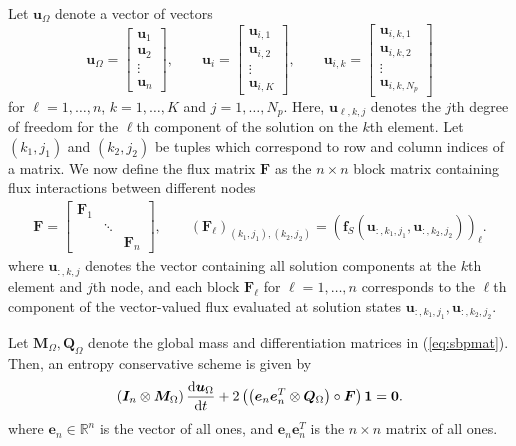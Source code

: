 \documentclass{article}
\newcommand{\td}[2]{\frac{{\rm d}#1}{{\rm d}{ {#2}}}}
\newcommand{\LRp}[1]{\left( #1 \right)}
\newcommand{\eq}[1]{\begin{align*}#1\end{align*}}
\newcommand{\eqlab}[1]{\begin{align}#1\end{align}}
\newcommand{\bmat}[1]{\begin{bmatrix}#1\end{bmatrix}}
\begin{document}
Let $\bm{u}_{\Omega}$ denote a vector of vectors 
\[
\bm{u}_{\Omega} = \bmat{\bm{u}_1\\
\bm{u}_2\\
\vdots\\
\bm{u}_n}, \qquad \bm{u}_i = \bmat{
\bm{u}_{i,1}\\
\bm{u}_{i,2}\\
\vdots\\
\bm{u}_{i,K}
}, \qquad
\bm{u}_{i,k} = \bmat{
\bm{u}_{i,k,1}\\
\bm{u}_{i,k,2}\\
\vdots\\
\bm{u}_{i,k,N_p}
}
\]
for $\ell = 1,\ldots, n$, $k = 1,\ldots, K$ and $j = 1,\ldots, N_p$.  Here, $\bm{u}_{\ell,k,j}$ denotes the $j$th degree of freedom for the $\ell$th component of the solution on the $k$th element.  
Let $(k_1, j_1)$ and $(k_2, j_2)$ be tuples which correspond to row and column indices of a matrix.  
We now define the flux matrix $\bm{F}$ as the $n\times n$ block matrix containing flux interactions between different nodes
\eqlab{
\bm{F} = \bmat{
\bm{F}_1 &&\\
& \ddots &\\
&& \bm{F}_n
}, \qquad \LRp{\bm{F}_\ell}_{(k_1, j_1),(k_2,j_2)} = \LRp{\bm{f}_{S}\LRp{\bm{u}_{:, k_1,j_1},\bm{u}_{:, k_2,j_2}}}_{\ell}.
\label{eq:fluxsys}
}
where $\bm{u}_{:,k,j}$ denotes the vector containing all solution components at the $k$th element and $j$th node, and each block $\bm{F}_\ell$ for $\ell = 1,\ldots, n$ corresponds to the $\ell$th component of the vector-valued flux evaluated at solution states $\bm{u}_{:,k_1,j_1},\bm{u}_{:,k_2,j_2}$.  

Let $\bm{M}_{\Omega}, \bm{Q}_{\Omega}$ denote the global mass and differentiation matrices in (\ref{eq:sbpmat}).  Then, an entropy conservative scheme is given by
\[
\LRp{\bm{I}_n\otimes \bm{M}_{\Omega}}\td{\bm{u}_{\Omega}}{t} + 2\LRp{ \LRp{\bm{e}_n\bm{e}_n^T\otimes \bm{Q}_{\Omega} } \circ \bm{F}}\bm{1} = \bm{0}.
\]
where $\bm{e}_n\in \mathbb{R}^n$ is the vector of all ones, and $\bm{e}_n\bm{e}_n^T$ is the $n\times n$ matrix of all ones.  
\end{document}
